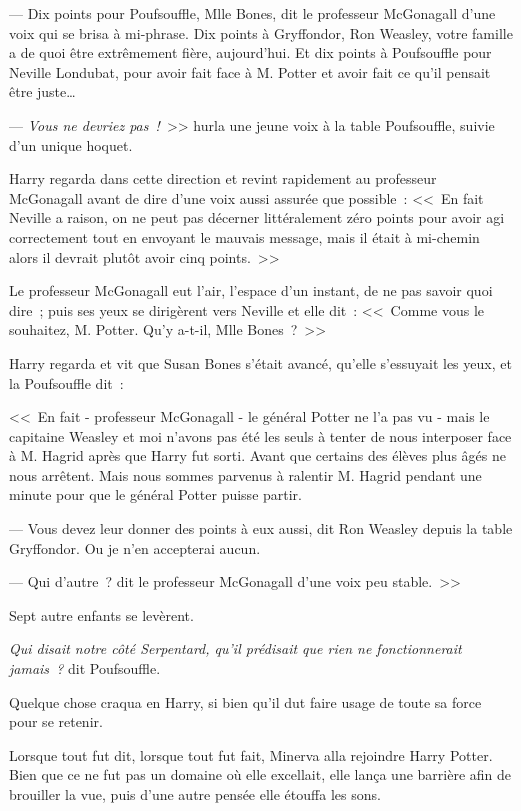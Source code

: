 --- Dix points pour Poufsouffle, Mlle Bones, dit le professeur McGonagall d'une voix qui se brisa à mi-phrase. Dix points à Gryffondor, Ron Weasley, votre famille a de quoi être extrêmement fière, aujourd'hui. Et dix points à Poufsouffle pour Neville Londubat, pour avoir fait face à M. Potter et avoir fait ce qu'il pensait être juste…

--- \emph{Vous ne devriez pas~!}~>> hurla une jeune voix à la table Poufsouffle, suivie d'un unique hoquet.

Harry regarda dans cette direction et revint rapidement au professeur McGonagall avant de dire d'une voix aussi assurée que possible~: <<~En fait Neville a raison, on ne peut pas décerner littéralement zéro points pour avoir agi correctement tout en envoyant le mauvais message, mais il était à mi-chemin alors il devrait plutôt avoir cinq points.~>>

Le professeur McGonagall eut l'air, l'espace d'un instant, de ne pas savoir quoi dire~; puis ses yeux se dirigèrent vers Neville et elle dit~: <<~Comme vous le souhaitez, M. Potter. Qu'y a-t-il, Mlle Bones~?~>>

Harry regarda et vit que Susan Bones s'était avancé, qu'elle s'essuyait les yeux, et la Poufsouffle dit~:

<<~En fait - professeur McGonagall - le général Potter ne l'a pas vu - mais le capitaine Weasley et moi n'avons pas été les seuls à tenter de nous interposer face à M. Hagrid après que Harry fut sorti. Avant que certains des élèves plus âgés ne nous arrêtent. Mais nous sommes parvenus à ralentir M. Hagrid pendant une minute pour que le général Potter puisse partir.

--- Vous devez leur donner des points à eux aussi, dit Ron Weasley depuis la table Gryffondor. Ou je n'en accepterai aucun.

--- Qui d'autre~? dit le professeur McGonagall d'une voix peu stable.~>>

Sept autre enfants se levèrent.

\emph{Qui disait notre côté Serpentard, qu'il prédisait que rien ne fonctionnerait jamais~?} dit Poufsouffle.

Quelque chose craqua en Harry, si bien qu'il dut faire usage de toute sa force pour se retenir.

\later

Lorsque tout fut dit, lorsque tout fut fait, Minerva alla rejoindre Harry Potter. Bien que ce ne fut pas un domaine où elle excellait, elle lança une barrière afin de brouiller la vue, puis d'une autre pensée elle étouffa les sons.

